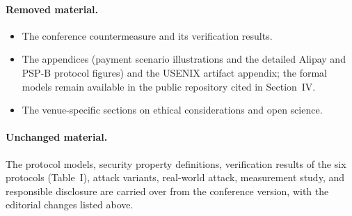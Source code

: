 \documentclass[11pt]{article}
\begin{document}
\paragraph{Removed material.}
\begin{itemize}
  \item The conference countermeasure and its verification results.
  \item The appendices (payment scenario illustrations and the detailed Alipay and PSP-B protocol figures) and the USENIX artifact appendix; the formal models remain available in the public repository cited in Section~IV.
  \item The venue-specific sections on ethical considerations and open science.
\end{itemize}

\paragraph{Unchanged material.}
The protocol models, security property definitions, verification results of the six protocols (Table~I), attack variants, real-world attack, measurement study, and responsible disclosure are carried over from the conference version, with the editorial changes listed above.
\end{document}

